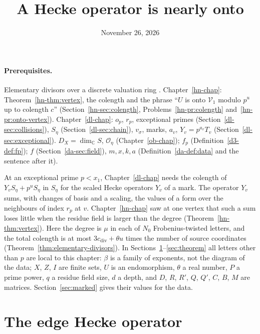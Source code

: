 \documentclass[reqno]{amsart}
\title{A Hecke operator is nearly onto}
\author{}
\date{November 26, 2026}
\newcounter{chap}
\numberwithin{equation}{section}
\theoremstyle{plain}
\theoremstyle{definition}
\theoremstyle{remark}
\newcommand{\C}{\mathbb{C}}
\newcommand{\Oc}{\mathcal O}
\newcommand{\cdiv}{c_{\mathrm{div}}}
\begin{document}
\maketitle
{}\label{chap}

\paragraph{Prerequisites.}
Elementary divisors over a discrete valuation ring \cite[Ch.~III, \S7]{La}.  Chapter~\ref{hn-chap}: Theorem~\ref{hn-thm:vertex}, the colength and the phrase ``\(U\) is onto \(\mathcal V_1\) modulo \(p^u\) up to colength \(c\)'' (Section~\ref{hn-sec:colength}, Problems~\ref{hn-pr:colength} and~\ref{hn-pr:onto-vertex}).  Chapter~\ref{dl-chap}: \(o_p\), \(r_p\), exceptional primes (Section~\ref{dl-sec:collisions}), \(S_\eta\) (Section~\ref{dl-sec:chain}), \(v_\sigma\), marks, \(a_v\), \(Y_v = p^{a_v}T_v\) (Section~\ref{dl-sec:exceptional}).  \(D_X = \dim_{\C} S\), \(\Oc_\eta\) (Chapter~\ref{ob-chap}); \(f_p\) (Definition~\ref{d3-def:fp}); \(f\) (Section~\ref{da-sec:field}), \(m, x, k, a\) (Definition~\ref{da-def:data} and the sentence after it).

\medskip
At an exceptional prime \(p < x_1\), Chapter~\ref{dl-chap} needs the colength of \(Y_v S_\eta + p^u S_\eta\) in \(S_\eta\) for the scaled Hecke operators \(Y_v\) of a mark.  The operator \(Y_v\) sums, with changes of basis and a scaling, the values of a form over the neighbours of index \(r_p\) at \(v\).  Chapter~\ref{hn-chap} saw at one vertex that such a sum loses little when the residue field is larger than the degree (Theorem~\ref{hn-thm:vertex}).  Here the degree is \(\mu\) in each of \(N_0\) Frobenius-twisted letters, and the total colength is at most \(3\cdiv + \theta u\) times the number of source coordinates (Theorem~\ref{thm:elementary-divisors}).  In Sections~\ref{sec:edge}--\ref{sec:theorem} all letters other than \(p\) are local to this chapter: \(\beta\) is a family of exponents, not the diagram of the data; \(X\), \(Z\), \(I\) are finite sets, \(U\) is an endomorphism, \(\theta\) a real number, \(P\) a prime power, \(q\) a residue field size, \(d\) a depth, and \(D\), \(R\), \(R'\), \(Q\), \(Q'\), \(C\), \(B\), \(M\) are matrices.  Section~\ref{sec:marked} gives their values for the data.

\section{The edge Hecke operator}\label{sec:edge}
\end{document}
